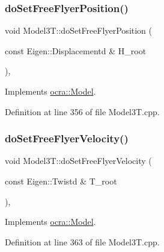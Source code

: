 \hypertarget{classModel3T_ab239abd9e83130d463503eb5915e2ed1}{}\label{classModel3T_ab239abd9e83130d463503eb5915e2ed1} 
\subsubsection{\texorpdfstring{do\+Set\+Free\+Flyer\+Position()}{doSetFreeFlyerPosition()}}
{\footnotesize\ttfamily void Model3\+T\+::do\+Set\+Free\+Flyer\+Position (\begin{DoxyParamCaption}\item[{const Eigen\+::\+Displacementd \&}]{H\+\_\+root }\end{DoxyParamCaption})\hspace{0.3cm}{\ttfamily [protected]}, {\ttfamily [virtual]}}



Implements \hyperlink{classocra_1_1Model_a4174e9fd30f913f43e516bbef9583ca2}{ocra\+::\+Model}.



Definition at line 356 of file Model3\+T.\+cpp.

\hypertarget{classModel3T_a21b50cac2862f3721db524437282a7b3}{}\label{classModel3T_a21b50cac2862f3721db524437282a7b3} 
\subsubsection{\texorpdfstring{do\+Set\+Free\+Flyer\+Velocity()}{doSetFreeFlyerVelocity()}}
{\footnotesize\ttfamily void Model3\+T\+::do\+Set\+Free\+Flyer\+Velocity (\begin{DoxyParamCaption}\item[{const Eigen\+::\+Twistd \&}]{T\+\_\+root }\end{DoxyParamCaption})\hspace{0.3cm}{\ttfamily [protected]}, {\ttfamily [virtual]}}



Implements \hyperlink{classocra_1_1Model_aad824e82f724f24e3769c74355162bda}{ocra\+::\+Model}.



Definition at line 363 of file Model3\+T.\+cpp.

\hypertarget{classModel3T_a603f405545e77d1e16449581876b005d}{}\label{classModel3T_a603f405545e77d1e16449581876b005d} 
